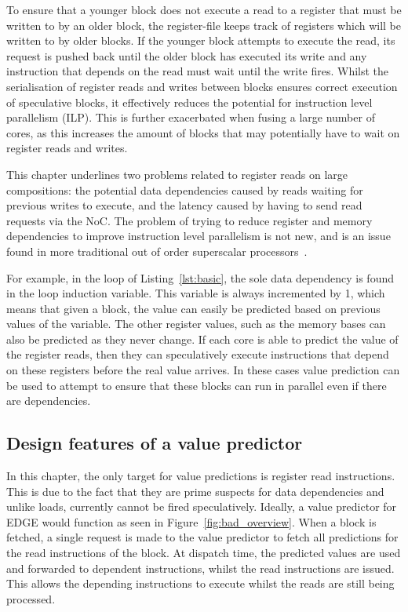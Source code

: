 To ensure that a younger block does not execute a read to a register that must be written to by an older block, the register-file keeps track of registers which will be written to by older blocks.
If the younger block attempts to execute the read, its request is pushed back until the older block has executed its write and any instruction that depends on the read must wait until the write fires.
Whilst the serialisation of register reads and writes between blocks ensures correct execution of speculative blocks, it effectively reduces the potential for instruction level parallelism (ILP).
This is further exacerbated when fusing a large number of cores, as this increases the amount of blocks that may potentially have to wait on register reads and writes.

This chapter underlines two problems related to register reads on large compositions: the potential data dependencies caused by reads waiting for previous writes to execute, and the latency caused by having to send read requests via the NoC.
The problem of trying to reduce register and memory dependencies to improve instruction level parallelism is not new, and is an issue found in more traditional out of order superscalar processors~\cite{peraisVTAGE2014}.

For example, in the loop of Listing~\ref{lst:basic}, the sole data dependency is found in the loop induction variable.
This variable is always incremented by 1, which means that given a block, the value can easily be predicted based on previous values of the variable.
The other register values, such as the memory bases can also be predicted as they never change.
If each core is able to predict the value of the register reads, then they can speculatively execute instructions that depend on these registers before the real value arrives.
In these cases value prediction can be used to attempt to ensure that these blocks can run in parallel even if there are dependencies.


\subsection{Design features of a value predictor}

In this chapter, the only target for value predictions is register read instructions.
This is due to the fact that they are prime suspects for data dependencies and unlike loads, currently cannot be fired speculatively.
Ideally, a value predictor for EDGE would function as seen in Figure~\ref{fig:bad_overview}.
When a block is fetched, a single request is made to the value predictor to fetch all predictions for the read instructions of the block.
At dispatch time, the predicted values are used and forwarded to dependent instructions, whilst the read instructions are issued.
This allows the depending instructions to execute whilst the reads are still being processed.


